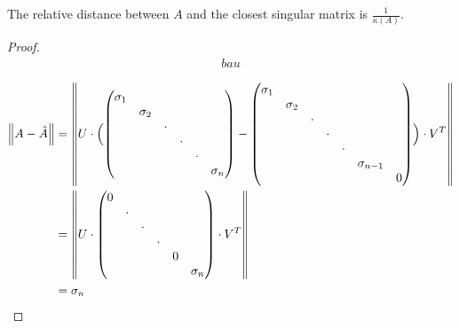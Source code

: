 \documentclass[computational_mathematics.tex]{subfiles}
\begin{document}
\begin{proposition}
The relative distance between $A$ and the closest singular matrix is $\frac{1}{\kappa(A)}$.
\end{proposition}
\begin{proof}


\begin{equation}
  \begin{aligned}
bau
  \end{aligned}
\end{equation}

\begin{equation}
  \begin{aligned}
    \left\lVert A - \hat{A}\right\rVert &= \left\lVert U \cdot 
    \Bigl(
    \begin{pmatrix}
      \sigma_1 &&&&&\\
      & \sigma_2&&&&\\
      && \cdot&&&\\
      &&& \cdot&&\\
      &&&& \cdot&\\
      &&&&& \sigma_n\\
    \end{pmatrix} -
    \begin{pmatrix}
      \sigma_1 &&&&&\\
      & \sigma_2&&&&\\
      && \cdot&&&\\
      &&& \cdot&&\\
      &&&& \cdot&\\
      &&&&& \sigma_{n-1}\\
      &&&&&& 0\\
    \end{pmatrix} \Bigr) \cdot {V}^{T}\right\rVert\\
    &= \left\lVert U \cdot 
    \begin{pmatrix}
      0 &&&&&\\
      & \cdot &&&&\\
      && \cdot&&&\\
      &&& \cdot&&\\
      &&&& 0&\\
      &&&&& \sigma_n\\
    \end{pmatrix} \cdot {V}^{T}\right\rVert\\
    &= \sigma_n\\
  \end{aligned}
\end{equation}


\end{proof}
\end{document}
